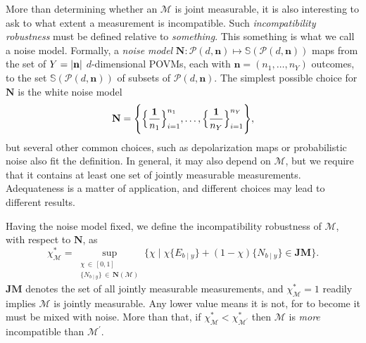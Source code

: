 				More than determining whether an $\mathcal{M}$ is joint measurable, it is also interesting to ask to what extent a measurement is incompatible. Such \emph{incompatibility robustness} must be defined relative to \emph{something}. This something is what we call a noise model. Formally, a \emph{noise model} $\mathbf{N} : \mathcal{P}(d, \mathbf{n}) \mapsto \mathbb{S}(\mathcal{P}(d, \mathbf{n}))$ maps from the set of $Y = \abs{\mathbf{n}}$ $d$-dimensional POVMs, each with $\mathbf{n} = (n_1, \ldots, n_Y)$ outcomes, to the set $\mathbb{S}(\mathcal{P}(d, \mathbf{n}))$ of subsets of $\mathcal{P}(d, \mathbf{n})$. The simplest possible choice for $\mathbf{N}$ is the white noise model
				$$
					\mathbf{N} = \Bigg\{ \Big\{ \frac{\mathbf{1}}{n_1} \Big\}_{i=1}^{n_1}, \ldots, \Big\{ \frac{\mathbf{1}}{n_Y} \Big\}_{i=1}^{n_Y} \Bigg\} ,
				$$
				but several other common choices, such as depolarization maps or probabilistic noise also fit the definition. In general, it may also depend on $\mathcal{M}$, but we require that it contains at least one set of jointly measurable measurements. Adequateness is a matter of application, and different choices may lead to different results.

				Having the noise model fixed, we define the incompatibility robustness of $\mathcal{M}$, with respect to $\mathbf{N}$, as
				\begin{equation}
				    \chi^*_\mathcal{M} = \sup_{\substack{\chi \,\in\, [0, 1]\\ \{ N_{b \mid y}\} \,\in\, \textbf{N}( \mathcal{M} )}} \Big\{ \chi \mid \chi \{ E_{b \mid y} \} + (1 - \chi) \{ N_{b \mid y} \} \in \textbf{JM} \Big\} .
				    \label{eq:incompatibility-robustness}
				\end{equation}
				$\textbf{JM}$ denotes the set of all jointly measurable measurements, and $\chi^*_\mathcal{M} = 1$ readily implies $\mathcal{M}$ is jointly measurable. Any lower value means it is not, for to become it must be mixed with noise. More than that, if $\chi^*_\mathcal{M} < \chi^*_{\mathcal{M}^\prime}$ then $\mathcal{M}$ is \emph{more} incompatible than $\mathcal{M}^\prime$.

